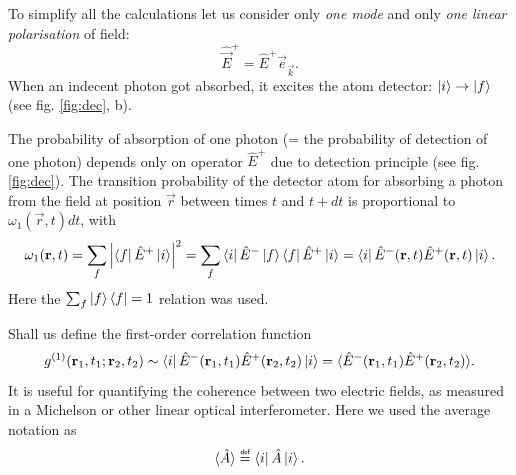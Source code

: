 To simplify all the calculations let us consider only \textit{one mode} and only \textit{one linear polarisation} of field:
\begin{equation}
	\hat{\vec{E}}^+ = \hat{E}^+ \vec{e}_{\vec{k}}.
\end{equation}
When an indecent photon got absorbed, it excites the atom detector: $\left\lvert {i} \right\rangle \to \left\lvert {f} \right\rangle$ (see fig. \ref{fig:dec}, b).


The probability of  absorption of one photon (= the probability of detection of one photon) depends only on operator $\hat{E}^+$ due to detection principle (see fig. \ref{fig:dec}). The transition probability of the detector atom for absorbing a photon from the field at position $\vec{r}$ between times $t$ and $t+dt$ is proportional to $\omega_1(\vec{r},t) dt$, with
\begin{equation}
	\omega_1 (\mathbf{r}, t) = \sum_{f} \left| \left\langle {f} \right\rvert \hat{E}^{+} \left\lvert {i} \right\rangle \right|^2 = \sum_{f} \left\langle {i} \right\rvert \hat{E}^{-} \left\lvert {f} \right\rangle \left\langle {f} \right\rvert \hat{E}^{+} \left\lvert {i} \right\rangle = \left\langle {i} \right\rvert \hat{E}^-(\mathbf{r},t) \hat{E}^+ (\mathbf{r},t) \left\lvert {i} \right\rangle.
\end{equation}
Here the $\sum_{f} \left\lvert {f} \right\rangle \left\langle {f} \right\rvert = 1$ relation was used.

Shall us define the first-order correlation function
\begin{equation}
	g^{(1)} (\mathbf{r}_1,t_1; \mathbf{r}_2, t_2) \sim \left\langle {i} \right\rvert \hat{E}^-(\mathbf{r}_1, t_1) \hat{E}^+ (\mathbf{r}_2, t_2) \left\lvert {i} \right\rangle = \langle \hat{E}^-(\mathbf{r}_1, t_1) \hat{E}^+ (\mathbf{r}_2, t_2) \rangle.
\end{equation}
It is useful for quantifying the coherence between two electric fields, as measured in a Michelson or other linear optical interferometer. Here we used the average notation as
\begin{equation}
	\langle \hat{A} \rangle \myeq \bra{i} \hat{A} \ket{i}.
\end{equation}

